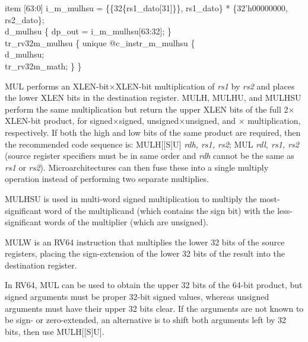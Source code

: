 {%
\indent item [63:0] i\_m\_mulhsu = \{\{32\{rs1\_dato[31]\}\}, rs1\_dato\} * \{32'h00000000, rs2\_dato\};\\%
\indent d\_mulhsu \{ dp\_out = i\_m\_mulhsu[63:32]; \}\\%
\indent tr\_rv32m\_mulhsu \{ unique @c\_instr\_m\_mulhsu \{ \\%
\indent \hspace{\parindent} d\_mulhsu; \\%
\indent \hspace{\parindent} tr\_rv32m\_math; \} \} \\%
}

MUL performs an XLEN-bit$\times$XLEN-bit multiplication
of {\em rs1} by {\em rs2} and places the
lower XLEN bits in the destination register.  MULH, MULHU, and MULHSU
perform the same multiplication but return the upper XLEN bits of the
full 2$\times$XLEN-bit product, for signed$\times$signed,
unsigned$\times$unsigned, and $\times$ multiplication,
respectively.  If both the high and low bits of the same product are
required, then the recommended code sequence is: MULH[[S]U] {\em rdh,
  rs1, rs2}; MUL {\em rdl, rs1, rs2} (source register specifiers must
be in same order and {\em rdh} cannot be the same as {\em rs1} or {\em
  rs2}).  Microarchitectures can then fuse these into a single
multiply operation instead of performing two separate multiplies.

\begin{commentary}
MULHSU is used in multi-word signed multiplication to multiply the
most-significant word of the multiplicand (which contains the sign bit)
with the less-significant words of the multiplier (which are unsigned).
\end{commentary}

MULW is an RV64 instruction that multiplies the lower 32 bits of the source
registers, placing the sign-extension of the lower 32 bits of the result
into the destination register.

\begin{commentary}
In RV64, MUL can be used to obtain the upper 32 bits of the 64-bit product,
but signed arguments must be proper 32-bit signed values, whereas unsigned
arguments must have their upper 32 bits clear.  If the
arguments are not known to be sign- or zero-extended, an alternative is to
shift both arguments left by 32 bits, then use MULH[[S]U].
\end{commentary}

